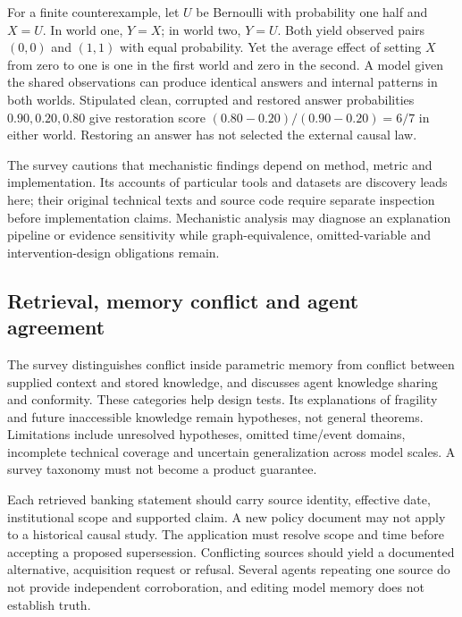 For a finite counterexample, let $U$ be Bernoulli with probability one half and $X=U$. In world one, $Y=X$; in world two, $Y=U$. Both yield observed pairs $(0,0)$ and $(1,1)$ with equal probability. Yet the average effect of setting $X$ from zero to one is one in the first world and zero in the second. A model given the shared observations can produce identical answers and internal patterns in both worlds. Stipulated clean, corrupted and restored answer probabilities $0.90,0.20,0.80$ give restoration score $(0.80-0.20)/(0.90-0.20)=6/7$ in either world. Restoring an answer has not selected the external causal law.~\citep{exec24_css_knowledge_reference}

The survey cautions that mechanistic findings depend on method, metric and implementation. Its accounts of particular tools and datasets are discovery leads here; their original technical texts and source code require separate inspection before implementation claims. Mechanistic analysis may diagnose an explanation pipeline or evidence sensitivity while graph-equivalence, omitted-variable and intervention-design obligations remain.~\citep{exec24_knowledge_original,exec24_css_knowledge_reference}

\subsection{Retrieval, memory conflict and agent agreement}
The survey distinguishes conflict inside parametric memory from conflict between supplied context and stored knowledge, and discusses agent knowledge sharing and conformity. These categories help design tests. Its explanations of fragility and future inaccessible knowledge remain hypotheses, not general theorems. Limitations include unresolved hypotheses, omitted time/event domains, incomplete technical coverage and uncertain generalization across model scales. A survey taxonomy must not become a product guarantee.~\citep{exec24_knowledge_original}

Each retrieved banking statement should carry source identity, effective date, institutional scope and supported claim. A new policy document may not apply to a historical causal study. The application must resolve scope and time before accepting a proposed supersession. Conflicting sources should yield a documented alternative, acquisition request or refusal. Several agents repeating one source do not provide independent corroboration, and editing model memory does not establish truth.~\citep{exec24_css_knowledge_reference}

